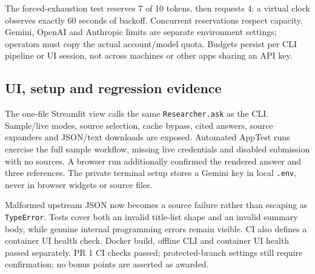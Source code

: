 \documentclass[11pt,a4paper]{article}
\begin{document}
The forced-exhaustion test reserves 7 of 10 tokens, then requests 4: a virtual clock observes exactly 60 seconds of backoff. Concurrent reservations respect capacity. Gemini, OpenAI and Anthropic limits are separate environment settings; operators must copy the actual account/model quota. Budgets persist per CLI pipeline or UI session, not across machines or other apps sharing an API key.

\subsection*{UI, setup and regression evidence}
The one-file Streamlit view calls the same \texttt{Researcher.ask} as the CLI. Sample/live modes, source selection, cache bypass, cited answers, source expanders and JSON/text downloads are exposed. Automated AppTest runs exercise the full sample workflow, missing live credentials and disabled submission with no sources. A browser run additionally confirmed the rendered answer and three references. The private terminal setup stores a Gemini key in local \texttt{.env}, never in browser widgets or source files.

Malformed upstream JSON now becomes a source failure rather than escaping as \texttt{TypeError}. Tests cover both an invalid title-list shape and an invalid summary body, while genuine internal programming errors remain visible. CI also defines a container UI health check. Docker build, offline CLI and container UI health passed separately. PR 1 CI checks passed; protected-branch settings still require confirmation; no bonus points are asserted as awarded.

\clearpage
\end{document}
